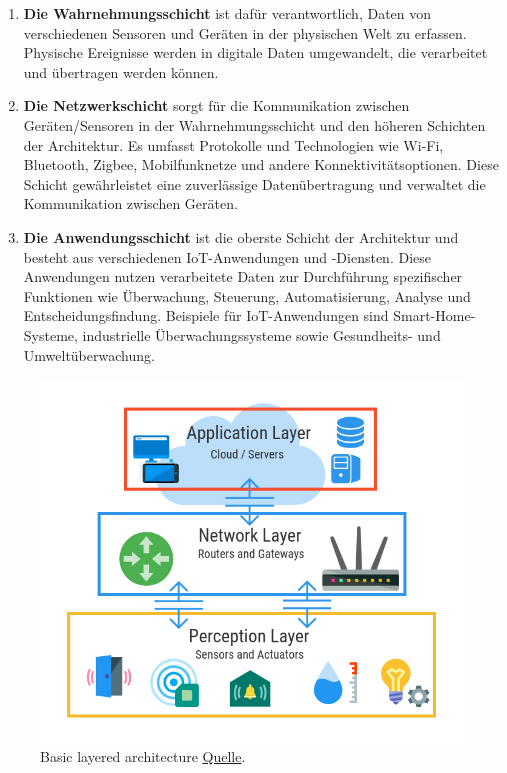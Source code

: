 \begin{enumerate}
    \item \textbf{Die Wahrnehmungsschicht} ist dafür verantwortlich, Daten von verschiedenen Sensoren und Geräten in der physischen Welt zu erfassen. Physische Ereignisse werden in digitale Daten umgewandelt, die verarbeitet und übertragen werden können. 

    \item \textbf{Die Netzwerkschicht} sorgt für die Kommunikation zwischen Geräten/Sensoren in der Wahrnehmungsschicht und den höheren Schichten der Architektur. Es umfasst Protokolle und Technologien wie Wi-Fi, Bluetooth, Zigbee, Mobilfunknetze und andere Konnektivitätsoptionen. Diese Schicht gewährleistet eine zuverlässige Datenübertragung und verwaltet die Kommunikation zwischen Geräten.

    \item \textbf{Die Anwendungsschicht} ist die oberste Schicht der Architektur und besteht aus verschiedenen IoT-Anwendungen und -Diensten. Diese Anwendungen nutzen verarbeitete Daten zur Durchführung spezifischer Funktionen wie Überwachung, Steuerung, Automatisierung, Analyse und Entscheidungsfindung. Beispiele für IoT-Anwendungen sind Smart-Home-Systeme, industrielle Überwachungssysteme sowie Gesundheits- und Umweltüberwachung.
\end{enumerate}

\begin{figure}[h]
  \centering
  \includegraphics[scale=0.3]{resources/three-layer-iot-architecture.png}
  \caption{Basic layered architecture \href{https://www.netburner.com/learn/architectural-frameworks-in-the-iot-civilization/}{Quelle}.}
  \label{fig:Basic_architecture}
\end{figure}

